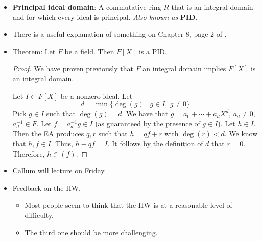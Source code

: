 \documentclass[../notes.tex]{subfiles}
\begin{document}
\begin{itemize}
    \item \textbf{Principal ideal domain}: A commutative ring $R$ that is an integral domain and for which every ideal is principal. \emph{Also known as} \textbf{PID}.
    \item There is a useful explanation of something on Chapter 8, page 2 of \textcite{bib:DummitFoote}.
    \item Theorem: Let $F$ be a field. Then $F[X]$ is a PID.
    \begin{proof}
        We have proven previously that $F$ an integral domain implies $F[X]$ is an integral domain.\par
        Let $I\subset F[X]$ be a nonzero ideal. Let
        \begin{equation*}
            d = \min\{\deg(g)\mid g\in I,\ g\neq 0\}
        \end{equation*}
        Pick $g\in I$ such that $\deg(g)=d$. We have that $g=a_0+\cdots+a_dX^d$, $a_d\neq 0$, $a_d^{-1}\in F$. Let $f=a_d^{-1}g\in I$ (as guaranteed by the presence of $g\in I$). Let $h\in I$. Then the EA produces $q,r$ such that $h=qf+r$ with $\deg(r)<d$. We know that $h,f\in I$. Thus, $h-qf=I$. It follows by the definition of $d$ that $r=0$. Therefore, $h\in(f)$.
    \end{proof}
    \item Callum will lecture on Friday.
    \item Feedback on the HW.
    \begin{itemize}
        \item Most people seem to think that the HW is at a reasonable level of difficulty.
        \item The third one should be more challenging.
    \end{itemize}
\end{itemize}
\end{document}
